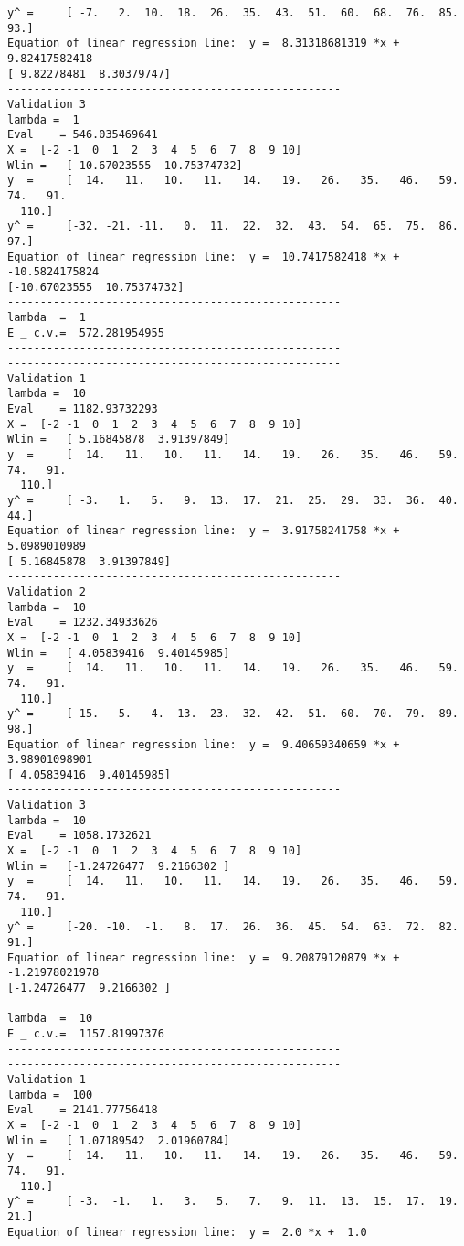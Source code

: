\documentclass{article}
\begin{document}
\begin{lstlisting}[breaklines=true,basicstyle=\small]
y^ =	 [ -7.   2.  10.  18.  26.  35.  43.  51.  60.  68.  76.  85.  93.]
Equation of linear regression line:  y =  8.31318681319 *x +  9.82417582418
[ 9.82278481  8.30379747]
---------------------------------------------------
Validation 3
lambda =  1
Eval	= 546.035469641
X =	 [-2 -1  0  1  2  3  4  5  6  7  8  9 10]
Wlin =	 [-10.67023555  10.75374732]
y  =	 [  14.   11.   10.   11.   14.   19.   26.   35.   46.   59.   74.   91.
  110.]
y^ =	 [-32. -21. -11.   0.  11.  22.  32.  43.  54.  65.  75.  86.  97.]
Equation of linear regression line:  y =  10.7417582418 *x +  -10.5824175824
[-10.67023555  10.75374732]
---------------------------------------------------
lambda  =  1
E _ c.v.=  572.281954955
---------------------------------------------------
---------------------------------------------------
Validation 1
lambda =  10
Eval	= 1182.93732293
X =	 [-2 -1  0  1  2  3  4  5  6  7  8  9 10]
Wlin =	 [ 5.16845878  3.91397849]
y  =	 [  14.   11.   10.   11.   14.   19.   26.   35.   46.   59.   74.   91.
  110.]
y^ =	 [ -3.   1.   5.   9.  13.  17.  21.  25.  29.  33.  36.  40.  44.]
Equation of linear regression line:  y =  3.91758241758 *x +  5.0989010989
[ 5.16845878  3.91397849]
---------------------------------------------------
Validation 2
lambda =  10
Eval	= 1232.34933626
X =	 [-2 -1  0  1  2  3  4  5  6  7  8  9 10]
Wlin =	 [ 4.05839416  9.40145985]
y  =	 [  14.   11.   10.   11.   14.   19.   26.   35.   46.   59.   74.   91.
  110.]
y^ =	 [-15.  -5.   4.  13.  23.  32.  42.  51.  60.  70.  79.  89.  98.]
Equation of linear regression line:  y =  9.40659340659 *x +  3.98901098901
[ 4.05839416  9.40145985]
---------------------------------------------------
Validation 3
lambda =  10
Eval	= 1058.1732621
X =	 [-2 -1  0  1  2  3  4  5  6  7  8  9 10]
Wlin =	 [-1.24726477  9.2166302 ]
y  =	 [  14.   11.   10.   11.   14.   19.   26.   35.   46.   59.   74.   91.
  110.]
y^ =	 [-20. -10.  -1.   8.  17.  26.  36.  45.  54.  63.  72.  82.  91.]
Equation of linear regression line:  y =  9.20879120879 *x +  -1.21978021978
[-1.24726477  9.2166302 ]
---------------------------------------------------
lambda  =  10
E _ c.v.=  1157.81997376
---------------------------------------------------
---------------------------------------------------
Validation 1
lambda =  100
Eval	= 2141.77756418
X =	 [-2 -1  0  1  2  3  4  5  6  7  8  9 10]
Wlin =	 [ 1.07189542  2.01960784]
y  =	 [  14.   11.   10.   11.   14.   19.   26.   35.   46.   59.   74.   91.
  110.]
y^ =	 [ -3.  -1.   1.   3.   5.   7.   9.  11.  13.  15.  17.  19.  21.]
Equation of linear regression line:  y =  2.0 *x +  1.0

\end{lstlisting}
\end{document}
